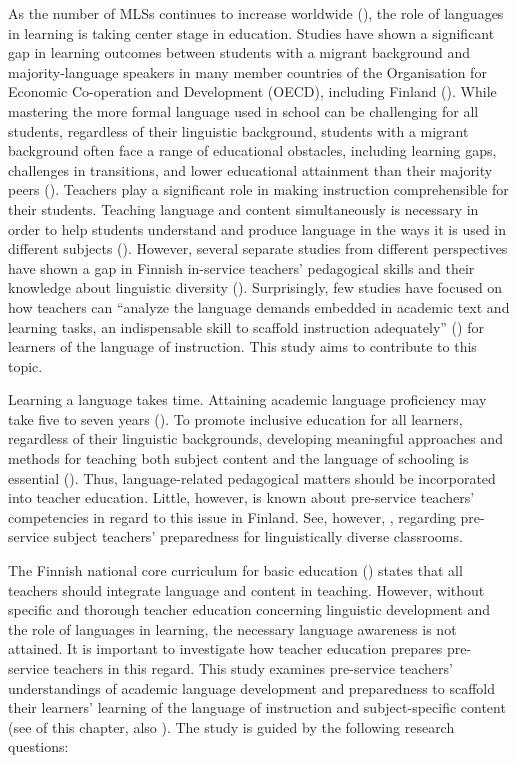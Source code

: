 \documentclass[output=paper]{langscibook}
\begin{document}
As the number of MLSs continues to increase worldwide (\citealt{Migration_data_portal2020}), the role of languages in learning is taking center stage in education. Studies have shown a significant gap in learning outcomes between students with a migrant background and majority-language speakers in many member countries of the Organisation for Economic Co-operation and Development (OECD), including Finland (\citealt{Ahonen2021}). While mastering the more formal language used in school can be challenging for all students, regardless of their linguistic background, students with a migrant background often face a range of educational obstacles, including learning gaps, challenges in transitions, and lower educational attainment than their majority peers (\citealt{Borgna2017}). Teachers play a significant role in making instruction comprehensible for their students. Teaching language and content simultaneously is necessary in order to help students understand and produce language in the ways it is used in different subjects (\citealt{CumminsEarly2015}). However, several separate studies from different perspectives have shown a gap in Finnish in-service teachers’ pedagogical skills and their knowledge about linguistic diversity (\citealt{AlisaariEtAl2019,Alisaari2020_Apples,HeikkolaEtAl2022}). Surprisingly, few studies have focused on how teachers can “analyze the language demands embedded in academic text and learning tasks, an indispensable skill to scaffold instruction adequately” (\citealt[152]{VillegasEtAl2018}) for learners of the language of instruction. This study aims to contribute to this topic.

Learning a language takes time. Attaining academic language proficiency may take five to seven years (\citealt{Cummins2021}). To promote inclusive education for all learners, regardless of their linguistic backgrounds, developing meaningful approaches and methods for teaching both subject content and the language of schooling is essential (\citealt{Harju-AuttiEtAl2022}). Thus, language-related pedagogical matters should be incorporated into teacher education. Little, however, is known about pre-service teachers’ competencies in regard to this issue in Finland. See, however, \citet{chapters/8_heikkola}, regarding pre-service subject teachers’ preparedness for linguistically diverse classrooms.

The Finnish national core curriculum for basic education (\citealt{Finnish_national_agency_of_education2014}) states that all teachers should integrate language and content in teaching. However, without specific and thorough teacher education concerning linguistic development and the role of languages in learning, the necessary language awareness is not attained. It is important to investigate how teacher education prepares pre-service teachers in this regard. This study examines pre-service teachers’ understandings of academic language development and preparedness to scaffold their learners’ learning of the language of instruction and subject-specific content (see  of this chapter, also \citealt{CarlsonEtAl2018}). The study is guided by the following research questions:
\end{document}
